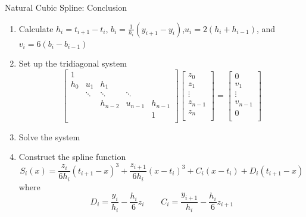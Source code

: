 \documentclass[10pt]{beamer}
\begin{document}
\begin{frame}{Natural Cubic Spline: Conclusion}

\begin{enumerate}
    \item Calculate $h_i=t_{i+1}-t_i$, $b_i=\frac{1}{h_i}(y_{i+1}-y_i)$,$u_i = 2 (h_i + h_{i-1} )$, and $v_i = 6(b_i - b_{i-1})$

    \item Set up the tridiagonal system 
    \[
\begin{bmatrix}
 1 &  & & &  \\ 
 h_0 & u_1  & h_1 & &  \\ 
 &   \ddots  & \ddots & \ddots  \\  
 &  & h_{n-2} &  u_{n-1}& h_{n-1}\\
 &  &   &         & 1\\
\end{bmatrix}
\begin{bmatrix}
z_0\\z_1\\  \vdots\\  z_{n-1}\\z_n\\
\end{bmatrix}
 = 
\begin{bmatrix}
0\\v_1\\  \vdots\\   v_{n-1}\\0\\
\end{bmatrix}
\] 

    \item Solve the system

    \item Construct the spline function
\begin{equation*}
  S_i(x) = \frac{z_i}{6h_i}(t_{i+1}-x)^3
+\frac{z_{i+1}}{6h_i}(x-t_i)^3 + C_i(x-t_i) + D_i(t_{i+1}-x)
\end{equation*}
where
\begin{equation*}
  D_i = \frac{y_i}{h_i} - \frac{h_i}{6}z_i \qquad
  C_i = \frac{y_{i+1}}{h_i} - \frac{h_i}{6}z_{i+1}
\end{equation*}
\end{enumerate}
\end{frame}
\end{document}
